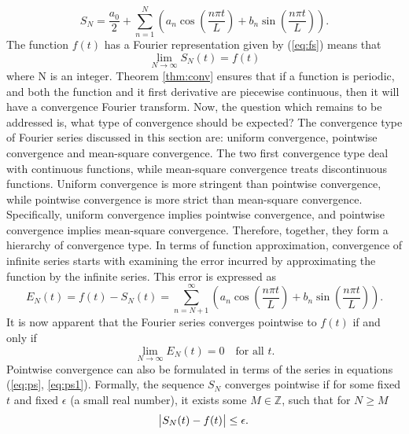 \documentclass[../Main/thesis.tex]{subfiles}
\begin{document}
\begin{equation}\label{eq:ps}
	S_{N} = \frac{a_{0}}{2} +\sum_{n=1}^{N}\left( a_{n} \cos\left( \frac{n\pi t}{L}\right) + b_{n} \sin\left( \frac{n\pi t}{L}\right)  \right).
\end{equation}\label{eq:ps1}
The function $f(t)$ has a Fourier representation given by (\ref{eq:fs}) means that 
\begin{equation}\label{eq:ps1}
\lim_{N\rightarrow\infty}S_{N}(t)= f(t)
\end{equation}
where N is an integer. 
\justify
Theorem \ref{thm:conv} ensures that if a function is periodic, and both the function and it first derivative are piecewise continuous, then it will have a convergence Fourier transform. Now, the question which remains to be addressed is, what type of convergence should be expected? The convergence type of Fourier series discussed in this section are: uniform convergence, pointwise convergence and mean-square convergence. The two first convergence type deal with continuous functions, while mean-square convergence treats discontinuous functions. 
\justify
Uniform convergence is more stringent than pointwise convergence, while pointwise convergence is more strict than mean-square convergence. Specifically, uniform convergence implies pointwise convergence, and pointwise convergence implies mean-square convergence. Therefore, together, they form a hierarchy of convergence type. 
\justify
In terms of function approximation, convergence of infinite series starts with examining the error incurred by approximating the function by the infinite series. This error is expressed as 
\begin{equation}\label{eq:error}
E_{N}(t) = f(t)-S_{N}(t) = \sum_{n=N+1}^{\infty}\left( a_{n} \cos\left( \frac{n\pi t}{L}\right) + b_{n} \sin\left( \frac{n\pi t}{L}\right)  \right).
\end{equation} 
It is now apparent that the Fourier series converges pointwise to $f(t)$ if and only if 
\begin{equation}
\lim_{N\rightarrow\infty}E_{N}(t)= 0\quad \text{for all $t$}.
\end{equation}
Pointwise convergence can also be formulated in terms of the series in equations (\ref{eq:ps}, \ref{eq:ps1}). Formally, the sequence $S_{N}$ converges pointwise if for some fixed $t$ and fixed $\epsilon$ (a small real number), it exists some $M\in \mathbb{Z}$, such that for $N\geq M$
\begin{equation}
\abs{S_{N}(t)-f(t)} \leq \epsilon.
\end{equation}
\end{document}
